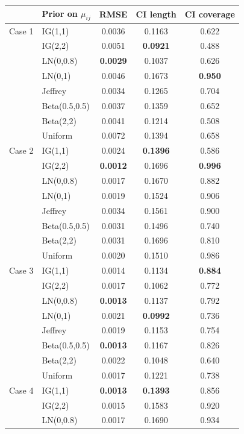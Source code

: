 \documentclass{amsart}
\begin{document}
\begin{table}[ht]
\centering
\begin{tabular}{l|l|ccc}
  \toprule
 & Prior on $\mu_{ij}$ & RMSE & CI length & CI coverage \\ 
  \midrule
Case 1 & IG(1,1) & 0.0036 & 0.1163 & 0.622 \\ 
  & IG(2,2) & 0.0051 & \textbf{0.0921} & 0.488 \\ 
  & LN(0,0.8) & \textbf{0.0029} & 0.1037 & 0.626 \\ 
  & LN(0,1) & 0.0046 & 0.1673 & \textbf{0.950} \\ 
  & Jeffrey & 0.0034 & 0.1265 & 0.704 \\ 
  & Beta(0.5,0.5) & 0.0037 & 0.1359 & 0.652 \\ 
  & Beta(2,2) & 0.0041 & 0.1214 & 0.508 \\ 
  & Uniform & 0.0072 & 0.1394 & 0.658 \\ 
   \midrule
Case 2 & IG(1,1) & 0.0024 & \textbf{0.1396} & 0.586 \\ 
  & IG(2,2) & \textbf{0.0012} & 0.1696 & \textbf{0.996} \\ 
  & LN(0,0.8) & 0.0017 & 0.1670 & 0.882 \\ 
  & LN(0,1) & 0.0019 & 0.1524 & 0.906 \\ 
  & Jeffrey & 0.0034 & 0.1561 & 0.900 \\ 
  & Beta(0.5,0.5) & 0.0031 & 0.1496 & 0.740 \\ 
  & Beta(2,2) & 0.0031 & 0.1696 & 0.810 \\ 
  & Uniform & 0.0020 & 0.1510 & 0.986 \\ 
   \midrule
Case 3 & IG(1,1) & 0.0014 & 0.1134 & \textbf{0.884} \\ 
  & IG(2,2) & 0.0017 & 0.1062 & 0.772 \\ 
  & LN(0,0.8) & \textbf{0.0013} & 0.1137 & 0.792 \\ 
  & LN(0,1) & 0.0021 & \textbf{0.0992} & 0.736 \\ 
  & Jeffrey & 0.0019 & 0.1153 & 0.754 \\ 
  & Beta(0.5,0.5) & \textbf{0.0013} & 0.1167 & 0.826 \\ 
  & Beta(2,2) & 0.0022 & 0.1048 & 0.640 \\ 
  & Uniform & 0.0017 & 0.1221 & 0.738 \\ 
   \midrule
Case 4 & IG(1,1) & \textbf{0.0013} & \textbf{0.1393} & 0.856 \\ 
  & IG(2,2) & 0.0015 & 0.1583 & 0.920 \\ 
  & LN(0,0.8) & 0.0017 & 0.1690 & 0.934 \\ 

\end{tabular}
\end{table}
\end{document}
